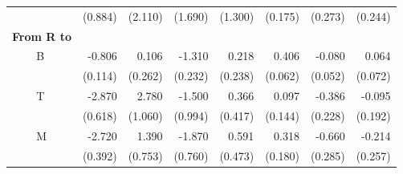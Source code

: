 \documentclass[11pt]{article}
\begin{document}
\begin{table}
\begin{tabular}{llrrrrrrr}
& & (0.884) &  (2.110) &  (1.690) &  (1.300) &  (0.175) &  (0.273) &  (0.244) \\[3pt]
\multicolumn{2}{l}{\textbf{From R to}} \\
& \multirow{2}{*}{B} & -0.806 &  0.106 & -1.310 &  0.218 &  0.406 & -0.080 &  0.064 \\
& & (0.114) &  (0.262) &  (0.232) &  (0.238) &  (0.062) &  (0.052) &  (0.072) \\[3pt]
& \multirow{2}{*}{T} & -2.870 &  2.780 & -1.500 &  0.366 &  0.097 & -0.386 & -0.095 \\
& & (0.618) &  (1.060) &  (0.994) &  (0.417) &  (0.144) &  (0.228) &  (0.192) \\[3pt]
& \multirow{2}{*}{M} & -2.720 &  1.390 & -1.870 &  0.591 &  0.318 & -0.660 & -0.214 \\
& & (0.392) &  (0.753) &  (0.760) &  (0.473) &  (0.180) &  (0.285) &  (0.257) \\[3pt]
\bottomrule
\end{tabular}
\end{table}
\end{document}
